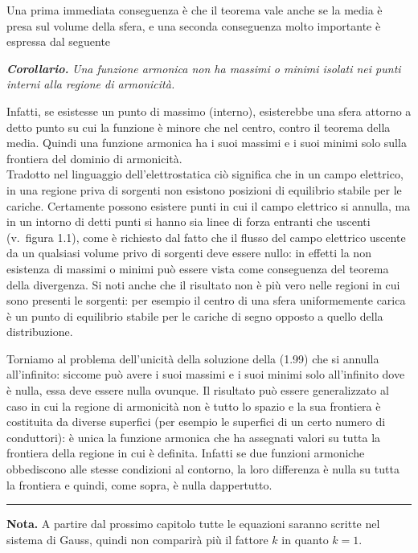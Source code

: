 Una prima immediata conseguenza è che il teorema vale anche se la media è presa sul volume della sfera, e una seconda conseguenza molto importante è espressa dal seguente

\textbf{\textit{Corollario.}} \textit{Una funzione armonica non ha massimi o minimi isolati nei punti interni alla regione di armonicità.}

Infatti, se esistesse un punto di massimo (interno), esisterebbe una sfera attorno a detto punto su cui la funzione è minore che nel centro, contro il teorema della media. Quindi una funzione armonica ha i suoi massimi e i suoi minimi solo sulla frontiera del dominio di armonicità.\\
Tradotto nel linguaggio dell'elettrostatica ciò significa che in un campo elettrico, in una regione priva di sorgenti non esistono posizioni di equilibrio stabile per le cariche. Certamente possono esistere punti in cui il campo elettrico si annulla, ma in un intorno di detti punti si hanno sia linee di forza entranti che uscenti (v.\ figura 1.1), come è richiesto dal fatto che il flusso del campo elettrico uscente da un qualsiasi volume privo di sorgenti deve essere nullo: in effetti la non esistenza di massimi o minimi può essere vista come conseguenza del teorema della divergenza. Si noti anche che il risultato non è più vero nelle regioni in cui sono presenti le sorgenti: per esempio il centro di una sfera uniformemente carica è un punto di equilibrio stabile per le cariche di segno opposto a quello della distribuzione.

Torniamo al problema dell'unicità della soluzione della (1.99) che si annulla all'infinito: siccome può avere i suoi massimi e i suoi minimi solo all'infinito dove è nulla, essa deve essere nulla ovunque. Il risultato può essere generalizzato al caso in cui la regione di armonicità non è tutto lo spazio e la sua frontiera è costituita da diverse superfici (per esempio le superfici di un certo numero di conduttori): è unica la funzione armonica che ha assegnati valori su tutta la frontiera della regione in cui è definita. Infatti se due funzioni armoniche obbediscono alle stesse condizioni al contorno, la loro differenza è nulla su tutta la frontiera e quindi, come sopra, è nulla dappertutto.

\bigskip
\noindent\rule{5cm}{0.4pt}

\textbf{Nota.} A partire dal prossimo capitolo tutte le equazioni saranno scritte nel sistema di Gauss, quindi non comparirà più il fattore $k$ in quanto $k=1$.
